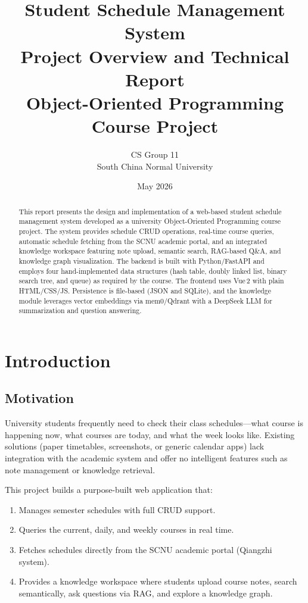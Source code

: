 \documentclass[12pt,a4paper]{article}
\title{
    \vspace{-1cm}
    \textbf{Student Schedule Management System} \\[0.3cm]
    \large Project Overview and Technical Report \\[0.2cm]
    \normalsize Object-Oriented Programming Course Project
}
\author{
    CS Group 11 \\
    South China Normal University
}
\date{May 2026}
\begin{document}
\maketitle
\thispagestyle{fancy}

\begin{abstract}
This report presents the design and implementation of a web-based student schedule management system developed as a university Object-Oriented Programming course project. The system provides schedule CRUD operations, real-time course queries, automatic schedule fetching from the SCNU academic portal, and an integrated knowledge workspace featuring note upload, semantic search, RAG-based Q\&A, and knowledge graph visualization. The backend is built with Python/FastAPI and employs four hand-implemented data structures (hash table, doubly linked list, binary search tree, and queue) as required by the course. The frontend uses Vue\,2 with plain HTML/CSS/JS. Persistence is file-based (JSON and SQLite), and the knowledge module leverages vector embeddings via mem0/Qdrant with a DeepSeek LLM for summarization and question answering.
\end{abstract}

\tableofcontents
\newpage

\section{Introduction}
\label{sec:intro}

\subsection{Motivation}

University students frequently need to check their class schedules---what course is happening now, what courses are today, and what the week looks like. Existing solutions (paper timetables, screenshots, or generic calendar apps) lack integration with the academic system and offer no intelligent features such as note management or knowledge retrieval.

This project builds a purpose-built web application that:
\begin{enumerate}[nosep]
    \item Manages semester schedules with full CRUD support.
    \item Queries the current, daily, and weekly courses in real time.
    \item Fetches schedules directly from the SCNU academic portal (Qiangzhi system).
    \item Provides a knowledge workspace where students upload course notes, search semantically, ask questions via RAG, and explore a knowledge graph.
\end{enumerate}
\end{document}
